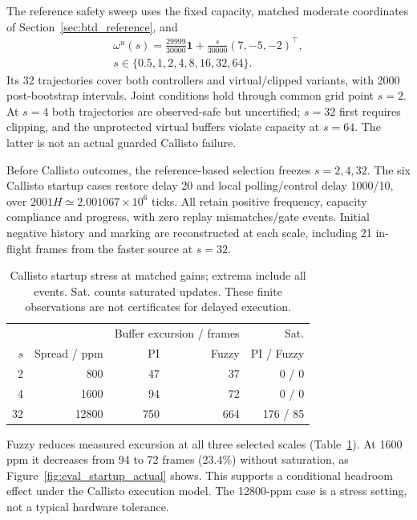 The reference safety sweep uses the fixed capacity, matched moderate
coordinates of Section~\ref{sec:btd_reference}, and
\begin{align}
 \omega^u(s)=\frac{29999}{30000}\mathbf1
                 +\frac{s}{30000}(7,-5,-2)^\top,\nonumber\\
 s\in\{0.5,1,2,4,8,16,32,64\}.
\end{align}
Its 32 trajectories cover both controllers and virtual/clipped
variants, with 2000 post-bootstrap intervals. Joint conditions hold
through common grid point $s=2$. At $s=4$ both trajectories are
observed-safe but uncertified; $s=32$ first requires clipping, and
the unprotected virtual buffers violate capacity at $s=64$.
The latter is not an actual guarded Callisto failure.

Before Callisto outcomes, the reference-based selection freezes
$s=2,4,32$. The six Callisto startup cases restore delay 20 and local
polling/control delay 1000/10, over $2001H\simeq2.001067\times10^6$
ticks. All retain positive frequency, capacity compliance and progress,
with zero replay mismatches/gate events. Initial negative history and
marking are reconstructed at each scale, including 21 in-flight frames
from the faster source at $s=32$.

\begin{table}[t]
\caption{Callisto startup stress at matched gains; extrema include all events.
Sat. counts saturated updates. These finite observations are not
certificates for delayed execution.}
\label{tab:eval_startup_safety}
\centering
\begin{tabular}{@{}rrrrr@{}}\toprule
 & & \multicolumn{2}{c}{Buffer excursion / frames} & Sat.\\
$s$ & Spread / ppm & PI & Fuzzy & PI / Fuzzy\\\midrule
2 & 800 & 47 & 37 & 0 / 0\\
4 & 1600 & 94 & 72 & 0 / 0\\
32 & 12800 & 750 & 664 & 176 / 85\\\bottomrule
\end{tabular}
\end{table}

Fuzzy reduces measured excursion at all three selected scales
(Table~\ref{tab:eval_startup_safety}). At 1600 ppm it decreases from
94 to 72 frames (23.4\%) without saturation, as
Figure~\ref{fig:eval_startup_actual} shows. This supports a conditional
headroom effect under the Callisto execution model. The 12800-ppm case
is a stress setting, not a typical hardware tolerance.

